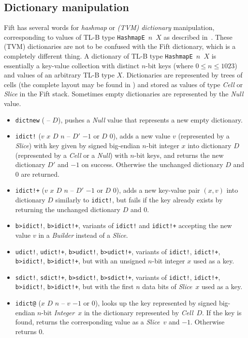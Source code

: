 \documentclass[12pt,oneside]{article}
\def\mysubsection#1{\subsection{#1}\fancyhead[C]{\small{\textsc{\textrm{\thesubsection.} #1}}}}
\begin{document}
\mysubsection{Dictionary manipulation}\label{p:hashmap.ops}
Fift has several words for {\em hashmap\/} or {\em (TVM) dictionary\/} manipulation, corresponding to values of TL-B type {\tt HashmapE $n$ $X$} as described in~\cite[3.3]{TVM}. These (TVM) dictionaries are not to be confused with the Fift dictionary, which is a completely different thing. A dictionary of TL-B type {\tt HashmapE $n$ $X$} is essentially a key-value collection with distinct $n$-bit keys (where $0\leq n\leq 1023$) and values of an arbitrary TL-B type $X$. Dictionaries are represented by trees of cells (the complete layout may be found in \cite[3.3]{TVM}) and stored as values of type {\em Cell\/} or {\em Slice\/} in the Fift stack. Sometimes empty dictionaries are represented by the {\em Null\/} value.
\begin{itemize}
\item {\tt dictnew} ( -- $D$), pushes a {\em Null\/} value that represents a new empty dictionary.
\item {\tt idict!} ($v$ $x$ $D$ $n$ -- $D'$ $-1$ or $D$ $0$), adds a new value $v$ (represented by a {\em Slice}) with key given by signed big-endian $n$-bit integer $x$ into dictionary $D$ (represented by a {\em Cell\/} or a {\em Null\/}) with $n$-bit keys, and returns the new dictionary $D'$ and $-1$ on success. Otherwise the unchanged dictionary $D$ and $0$ are returned.
\item {\tt idict!+} ($v$ $x$ $D$ $n$ -- $D'$ $-1$ or $D$ $0$), adds a new key-value pair $(x,v)$ into dictionary $D$ similarly to {\tt idict!}, but fails if the key already exists by returning the unchanged dictionary $D$ and $0$.
\item {\tt b>idict!}, {\tt b>idict!+}, variants of {\tt idict!} and {\tt idict!+} accepting the new value $v$ in a {\em Builder\/} instead of a {\em Slice}.
\item {\tt udict!}, {\tt udict!+}, {\tt b>udict!}, {\tt b>udict!+}, variants of {\tt idict!}, {\tt idict!+}, {\tt b>idict!}, {\tt b>idict!+}, but with an unsigned $n$-bit integer $x$ used as a key.
\item {\tt sdict!}, {\tt sdict!+}, {\tt b>sdict!}, {\tt b>sdict!+}, variants of {\tt idict!}, {\tt idict!+}, {\tt b>idict!}, {\tt b>idict!+}, but with the first $n$ data bits of {\em Slice\/}~$x$ used as a key.
\item {\tt idict@} ($x$ $D$ $n$ -- $v$ $-1$ or $0$), looks up the key represented by signed big-endian $n$-bit {\em Integer\/}~$x$ in the dictionary represented by {\em Cell\/}~$D$. If the key is found, returns the corresponding value as a {\em Slice\/}~$v$ and $-1$. Otherwise returns $0$.

\end{itemize}
\end{document}
